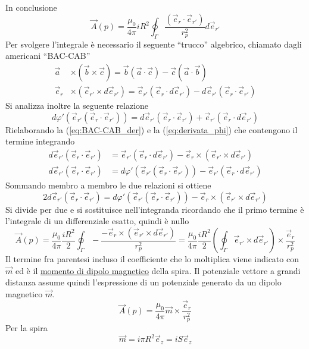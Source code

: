 In conclusione 
$$
\vec{A}(p) = \frac{\mu_0}{4\pi}iR^2 \oint_\Gamma \frac{(\vec{e}_r\cdot\vec{e}_{r'})}{r_p^2}d\vec{e}_{r'}
$$
Per svolgere l'integrale è necessario il seguente ``trucco'' algebrico, chiamato
dagli americani ``BAC-CAB''
\begin{align}
\vec{a} &\times\left(\vec{b}\times\vec{c}\right) = \vec{b}\left(\vec{a}\cdot\vec{c}\right) - \vec{c}\left(\vec{a}\cdot\vec{b}\right) \\
\vec{e}_r &\times \left(\vec{e}_{r'}\times d\vec{e}_{r'}\right) = \vec{e}_{r'}\left(\vec{e}_r\cdot d\vec{e}_{r'}\right) - d\vec{e}_{r'}\left(\vec{e}_r\cdot\vec{e}_{r'}\right)
\label{eq:BAC-CAB_der}
\end{align}
Si analizza inoltre la seguente relazione
\begin{equation}
d\varphi'\left(\vec{e}_{r'}\left(\vec{e}_r\cdot\vec{e}_{r'}\right)\right) = d\vec{e}_{r'}\left(\vec{e}_r\cdot\vec{e}_{r'}\right) + \vec{e}_{r'}\left(\vec{e}_r\cdot d\vec{e}_{r'}\right)
\label{eq:derivata_phi}
\end{equation}
Rielaborando la (\ref{eq:BAC-CAB_der}) e la (\ref{eq:derivata_phi}) che contengono il termine integrando
\begin{align*}
d\vec{e}_{r'}\left(\vec{e}_r\cdot\vec{e}_{r'}\right) &= \vec{e}_{r'}\left(\vec{e}_r\cdot d\vec{e}_{r'}\right) - \vec{e}_r \times \left(\vec{e}_{r'}\times d\vec{e}_{r'}\right) \\
d\vec{e}_{r'}\left(\vec{e}_r\cdot\vec{e}_{r'}\right) &= d\varphi'\left(\vec{e}_{r'}\left(\vec{e}_r\cdot\vec{e}_{r'}\right)\right) - \vec{e}_{r'}\left(\vec{e}_r\cdot d\vec{e}_{r'}\right)
\end{align*}
Sommando membro a membro le due relazioni si ottiene
$$
2d\vec{e}_{r'}\left(\vec{e}_r\cdot\vec{e}_{r'}\right) = d\varphi'\left(\vec{e}_{r'}\left(\vec{e}_r\cdot\vec{e}_{r'}\right)\right) - \vec{e}_r \times \left(\vec{e}_{r'}\times d\vec{e}_{r'}\right)
$$
Si divide per due e si sostituisce nell'integranda ricordando che il primo termine è l'integrale di 
un differenziale esatto, quindi è nullo
$$
\vec{A}(p) = \frac{\mu_0}{4\pi}\frac{iR^2}{2}\oint_\Gamma - \frac{- \vec{e}_r \times \left(\vec{e}_{r'}\times d\vec{e}_{r'}\right)}{r_p^2} = \frac{\mu_0}{4\pi}\frac{iR^2}{2}\left(\oint_\Gamma\vec{e}_{r'}\times d\vec{e}_{r'} \right)\times \frac{\vec{e}_r}{r_p^2}
$$
Il termine fra parentesi incluso il coefficiente che lo moltiplica viene indicato con $\vec{m}$ ed
è il \href{https://it.wikipedia.org/wiki/Momento_magnetico}{momento di dipolo magnetico} della spira. Il potenziale vettore a grandi distanza assume quindi l'espressione
di un potenziale generato da un dipolo magnetico $\vec{m}$.
$$
\vec{A}(p) = \frac{\mu_0}{4\pi} \vec{m} \times \frac{\vec{e}_r}{r_p^2}
$$
Per la spira 
$$
\vec{m} = i\pi R^2 \vec{e}_z = i S \vec{e}_z
$$ 
